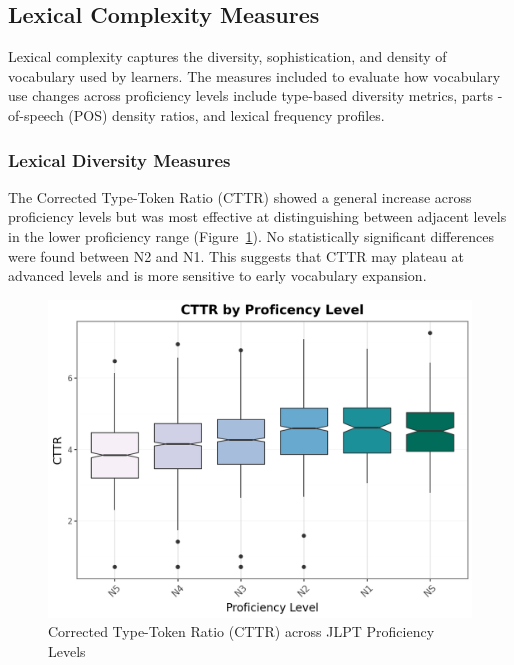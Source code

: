 \subsection{Lexical Complexity Measures}
Lexical complexity captures the diversity, sophistication, and density of vocabulary used by learners. The measures
included to evaluate how vocabulary use changes across proficiency levels include type-based diversity metrics, parts
-of-speech (POS) density ratios, and lexical frequency profiles.

\subsubsection{Lexical Diversity Measures}

The Corrected Type-Token Ratio (CTTR) showed a general increase across proficiency levels but was most effective at
distinguishing between adjacent levels in the lower proficiency range (Figure~\ref{fig:cttr}). No statistically significant
differences were
found between N2 and N1. This suggests that CTTR may plateau at advanced levels and is more sensitive to early
vocabulary expansion.

\begin{figure}[h]
    \centering
    \includegraphics[scale=.5]{img/CTTR}
    \caption[Corrected Type-Token Ratio (CTTR) across JLPT Proficiency Levels]{Corrected Type-Token Ratio (CTTR) across JLPT Proficiency Levels}
    \label{fig:cttr}
\end{figure}

